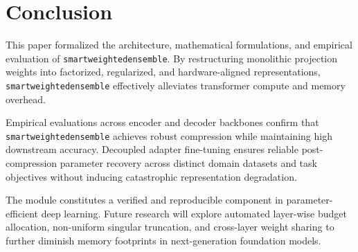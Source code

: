 \section{Conclusion}
This paper formalized the architecture, mathematical formulations, and empirical evaluation of \texttt{smartweightedensemble}. By restructuring monolithic projection weights into factorized, regularized, and hardware-aligned representations, \texttt{smartweightedensemble} effectively alleviates transformer compute and memory overhead.

Empirical evaluations across encoder and decoder backbones confirm that \texttt{smartweightedensemble} achieves robust compression while maintaining high downstream accuracy. Decoupled adapter fine-tuning ensures reliable post-compression parameter recovery across distinct domain datasets and task objectives without inducing catastrophic representation degradation.

The module constitutes a verified and reproducible component in parameter-efficient deep learning. Future research will explore automated layer-wise budget allocation, non-uniform singular truncation, and cross-layer weight sharing to further diminish memory footprints in next-generation foundation models.
